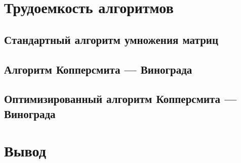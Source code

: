 \section{Трудоемкость алгоритмов}

\subsection{Стандартный алгоритм умножения матриц}

\subsection{Алгоритм Копперсмита — Винограда}

\subsection{Оптимизированный алгоритм Копперсмита —
	Винограда}

\section*{Вывод}


